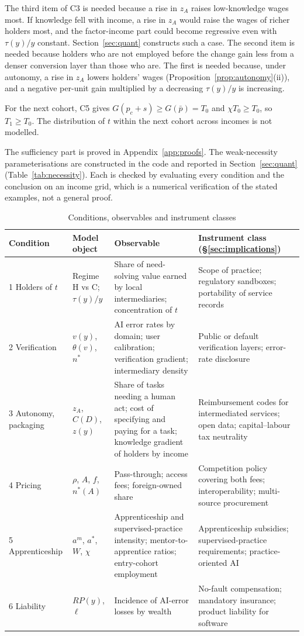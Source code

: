 \documentclass[12pt]{article}
\theoremstyle{remark}
\begin{document}
The third item of C3 is needed because a rise in $z_A$ raises low-knowledge wages most. If knowledge fell with income, a rise in $z_A$ would raise the wages of richer holders most, and the factor-income part could become regressive even with $\tau(y)/y$ constant. Section~\ref{sec:quant} constructs such a case. The second item is needed because holders who are not employed before the change gain less from a denser conversion layer than those who are. The first is needed because, under autonomy, a rise in $z_A$ lowers holders' wages (Proposition~\ref{prop:autonomy}(ii)), and a negative per-unit gain multiplied by a decreasing $\tau(y)/y$ is increasing.

For the next cohort, C5 gives $G(p_c+s)\ge G(\bar p)=T_0$ and $\chi T_0\ge T_0$, so $T_1\ge T_0$. The distribution of $t$ within the next cohort across incomes is not modelled.

The sufficiency part is proved in Appendix~\ref{app:proofs}. The weak-necessity parameterisations are constructed in the code and reported in Section~\ref{sec:quant} (Table~\ref{tab:necessity}). Each is checked by evaluating every condition and the conclusion on an income grid, which is a numerical verification of the stated examples, not a general proof.

\begin{table}[t]\centering\small
\caption{Conditions, observables and instrument classes}\label{tab:conditions}
\begin{tabular}{p{}p{}p{}p{}}
\toprule
Condition & Model object & Observable & Instrument class (\S\ref{sec:implications})\\
\midrule
1 Holders of $t$ & Regime H vs C; $\tau(y)/y$ & Share of need-solving value earned by local intermediaries; concentration of $t$ & Scope of practice; regulatory sandboxes; portability of service records\\
2 Verification & $v(y)$, $\theta(v)$, $n^*$ & AI error rates by domain; user calibration; verification gradient; intermediary density & Public or default verification layers; error-rate disclosure\\
3 Autonomy, packaging & $z_A$, $C(D)$, $z(y)$ & Share of tasks needing a human act; cost of specifying and paying for a task; knowledge gradient of holders by income & Reimbursement codes for intermediated services; open data; capital--labour tax neutrality\\
4 Pricing & $\rho$, $A$, $f$, $n^*(A)$ & Pass-through; access fees; foreign-owned share & Competition policy covering both fees; interoperability; multi-source procurement\\
5 Apprenticeship & $a^m$, $a^*$, $W$, $\chi$ & Apprenticeship and supervised-practice intensity; mentor-to-apprentice ratios; entry-cohort employment & Apprenticeship subsidies; supervised-practice requirements; practice-oriented AI\\
6 Liability & $RP(y)$, $\ell$ & Incidence of AI-error losses by wealth & No-fault compensation; mandatory insurance; product liability for software\\
\bottomrule
\end{tabular}
\end{table}
\end{document}

